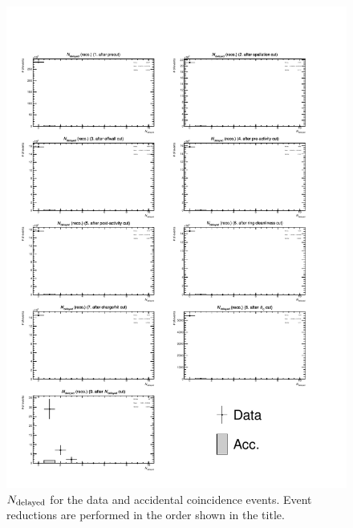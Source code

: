 \begin{figure}[h]
	\centering
	\includegraphics[width=15cm]{PDF/Dist_Data/Che_50deg_tag_ge1/RecoNumCap}
	\caption[$N_{\rm delayed}$ for the data and accidental coincidence events]{
	$N_{\rm delayed}$ for the data and accidental coincidence events.
	Event reductions are performed in the order shown in the title.
	}\label{Data_RecoNumCap}
\end{figure}

